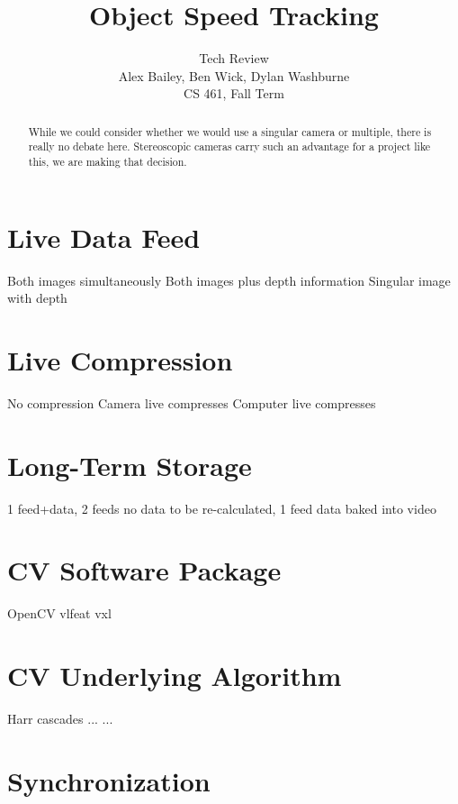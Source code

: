 \documentclass[letterpaper,10pt,onecolumn,draftclsnofoot]{IEEEtran}
\title{Object Speed Tracking}
\author{Tech Review\\Alex Bailey, Ben Wick, Dylan Washburne\\CS 461, Fall Term}
\begin{document}
\begin{titlepage}

\maketitle

\begin{abstract}
While we could consider whether we would use a singular camera or multiple, there is really no debate here.
Stereoscopic cameras carry such an advantage for a project like this, we are making that decision.
 
\end{abstract}

\end{titlepage}

\section{Live Data Feed} %

Both images simultaneously
Both images plus depth information
Singular image with depth

\section{Live Compression} %

No compression
Camera live compresses
Computer live compresses

\section{Long-Term Storage}%

1 feed+data, 
2 feeds no data to be re-calculated, 
1 feed data baked into video

\section{CV Software Package} %

OpenCV
vlfeat
vxl

\section{CV Underlying Algorithm} %

Harr cascades
...
...

\section{Synchronization} %
\end{document}
